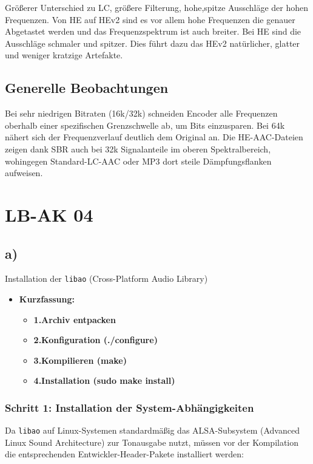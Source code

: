 \documentclass[11pt,a4paper]{article}
\begin{document}
Größerer Unterschied zu LC, größere Filterung, hohe,spitze Ausschläge der hohen Frequenzen. Von HE auf HEv2 sind es vor allem hohe Frequenzen die genauer Abgetastet werden und das Frequenzspektrum ist auch breiter. Bei HE sind die Ausschläge schmaler und spitzer.
Dies führt dazu das HEv2 natürlicher, glatter und weniger kratzige Artefakte.


\subsection{Generelle Beobachtungen}
Bei sehr niedrigen Bitraten (16k/32k) schneiden Encoder alle Frequenzen oberhalb einer spezifischen Grenzschwelle ab, um Bits einzusparen. Bei 64k nähert sich der Frequenzverlauf deutlich dem Original an. Die HE-AAC-Dateien zeigen dank SBR auch bei 32k Signalanteile im oberen Spektralbereich, wohingegen Standard-LC-AAC oder MP3 dort steile Dämpfungsflanken aufweisen.

\newpage
\section{LB-AK 04}

\subsection{a)}
Installation der \texttt{libao} (Cross-Platform Audio Library)


\begin{itemize}
    \item \textbf{Kurzfassung:}
    \begin{itemize}
        \item \textbf{1.Archiv entpacken}
        \item \textbf{2.Konfiguration (./configure)}
        \item \textbf{3.Kompilieren (make)}
        \item \textbf{4.Installation (sudo make install)}
    \end{itemize}
\end{itemize}

\subsubsection{Schritt 1: Installation der System-Abhängigkeiten}
Da \texttt{libao} auf Linux-Systemen standardmäßig das ALSA-Subsystem (Advanced Linux Sound Architecture) zur Tonausgabe nutzt, müssen vor der Kompilation die entsprechenden Entwickler-Header-Pakete installiert werden:
\end{document}
